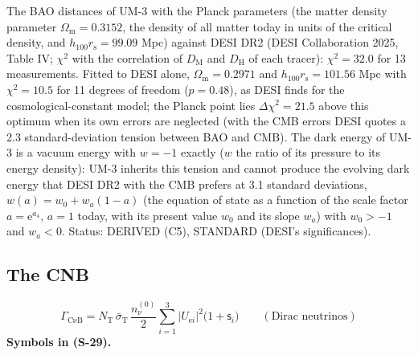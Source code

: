 \documentclass[
  10pt,
]{article}
\begin{document}
The BAO distances of UM-3 with the Planck parameters (the matter density
parameter \(\Omega_{\mathrm{m}} = 0.3152\), the density of all matter
today in units of the critical density, and
\(h_{100}r_{\mathrm{s}} = 99.09\) Mpc) against DESI DR2 (DESI
Collaboration 2025, Table IV; \(\chi^2\) with the correlation of
\(D_{\mathrm{M}}\) and \(D_{\mathrm{H}}\) of each tracer):
\(\chi^2 = 32.0\) for 13 measurements. Fitted to DESI alone,
\(\Omega_{\mathrm{m}} = 0.2971\) and \(h_{100}r_{\mathrm{s}} = 101.56\)
Mpc with \(\chi^2 = 10.5\) for 11 degrees of freedom (\(p = 0.48\)), as
DESI finds for the cosmological-constant model; the Planck point lies
\(\Delta\chi^2 = 21.5\) above this optimum when its own errors are
neglected (with the CMB errors DESI quotes a 2.3 standard-deviation
tension between BAO and CMB). The dark energy of UM-3 is a vacuum energy
with \(w = -1\) exactly (\(w\) the ratio of its pressure to its energy
density): UM-3 inherits this tension and cannot produce the evolving
dark energy that DESI DR2 with the CMB prefers at 3.1 standard
deviations, \(w(a) = w_0 + w_a(1 - a)\) (the equation of state as a
function of the scale factor \(a = \mathrm{e}^{a_4}\), \(a = 1\) today,
with its present value \(w_0\) and its slope \(w_a\)) with \(w_0 > -1\)
and \(w_a < 0\). Status: DERIVED (C5), STANDARD (DESI's significances).

\hypertarget{the-cnb}{%
\subsection{The CNB}\label{the-cnb}}

\[
\Gamma_{\mathrm{C\nu B}} = N_{\mathrm{T}}\,\bar\sigma_{\mathrm{T}}\,\frac{n_\nu^{(0)}}{2}\sum_{i=1}^{3}\lvert U_{\mathrm{e}i}\rvert^2\big(1 + \mathsf{s}_i\big)\qquad(\text{Dirac neutrinos}) \tag{S-29}
\] \textbf{Symbols in (S-29).}
\end{document}
